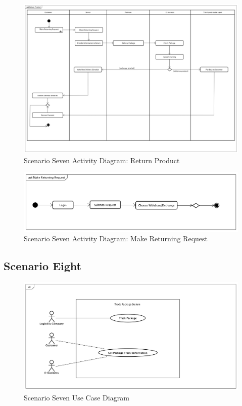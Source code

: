 \documentclass[12pt]{scrreprt}
\begin{document}
\begin{figure}[H]
  \centering\includegraphics[width=6in]{DocumentRes/7ReturnProduct.png}
  \caption{Scenario Seven Activity Diagram: Return Product}
\end{figure}

\begin{figure}[H]
  \centering\includegraphics[width=6in]{DocumentRes/7MakeReturningRequest.png}
  \caption{Scenario Seven Activity Diagram: Make Returning Request}
\end{figure}

\subsection{Scenario Eight}
\begin{figure}[H]
  \centering\includegraphics[width=5in]{DocumentRes/8UseCaseDiagram.png}
  \caption{Scenario Seven Use Case Diagram}
\end{figure}
\end{document}
